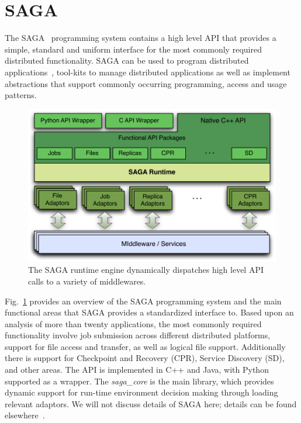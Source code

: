 \documentclass[3p,twocolumn]{elsarticle}
\begin{document}
\section{SAGA}

The SAGA~\cite{saga-core} programming system contains a high level API
that provides a simple, standard and uniform interface for the most
commonly required distributed functionality.  SAGA can be used to
program distributed applications~\cite{saga_escience07, saga_tg08},
tool-kits to manage distributed applications as well as implement
abstractions that support commonly occurring programming, access and
usage patterns.

\begin{figure}[t]
 \includegraphics[scale=0.5]{saga-figure02.pdf}
 \caption{The SAGA runtime engine dynamically dispatches high level
          API calls to a variety of middlewares.}
 \label{saga_figure}
\end{figure}

Fig.~\ref{saga_figure} provides an overview of the SAGA programming
system and the main functional areas that SAGA provides a standardized
interface to. Based upon an analysis of more than twenty applications,
the most commonly required functionality involve job submission across
different distributed platforms, support for file access and transfer,
as well as logical file support.  Additionally there is support for
Checkpoint and Recovery (CPR), Service Discovery (SD), and other
areas.  The API is implemented in C++ and Java, with Python supported
as a wrapper. The {\it saga\_core} is the main library, which provides
dynamic support for run-time environment decision making through
loading relevant adaptors. We will not discuss details of SAGA here;
details can be found elsewhere~\cite{saga_url,saga_design}.
\end{document}
